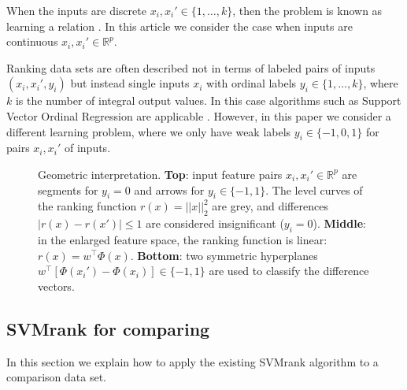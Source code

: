 \documentclass{article}
\newcommand{\RR}{\mathbb R}
\begin{document}
When the inputs are discrete $x_i,x_i'\in\{1,\dots,k\}$, then the
problem is known as learning a relation \citep{relations}. In this
article we consider the case when inputs are continuous
$x_i,x_i'\in\RR^p$.

Ranking data sets are often described not in terms of labeled pairs of
inputs $(x_i, x_i', y_i)$ but instead single inputs $x_i$ with ordinal
labels $y_i\in\{1,\dots,k\}$, where $k$ is the number of integral
output values. In this case algorithms such as Support Vector Ordinal
Regression are applicable \citep{ordinal}. However, in this paper we
consider a different learning problem, where we only have weak labels
$y_i\in\{-1,0,1\}$ for pairs $x_i,x_i'$ of inputs.




\begin{figure}
  \centering
  
  \vskip -0.5cm
  \caption{Geometric interpretation. \textbf{Top}: input feature pairs
    $x_i,x_i'\in\RR^p$ are segments for $y_i=0$ and arrows for
    $y_i\in\{-1,1\}$. The level curves of the ranking function
    $r(x)=||x||_2^2$ are grey, and differences $|r(x)-r(x')|\leq 1$
    are considered insignificant ($y_i=0$). \textbf{Middle}: in the
    enlarged feature space, the ranking function is linear:
    $r(x)=w^\intercal \Phi(x)$. \textbf{Bottom}: two symmetric
    hyperplanes $w^\intercal[\Phi(x_i')-\Phi(x_i)]\in\{-1,1\}$ are
    used to classify the difference vectors.}
  \label{fig:norm-data}
\end{figure}

\subsection{SVMrank for comparing}
\label{sec:svmrank}
In this section we explain how to apply the existing SVMrank algorithm
to a comparison data set.
\end{document}
